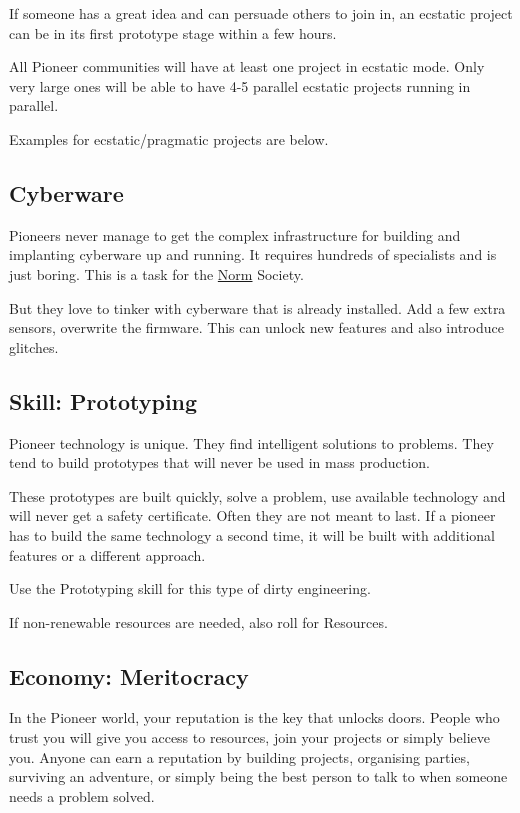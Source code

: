 If someone has a great idea and can persuade others to join in, an ecstatic project can be in its first prototype stage within a few hours.

All Pioneer communities will have at least one project in ecstatic mode. Only very large ones will be able to have 4-5 parallel ecstatic projects running in parallel.

Examples for ecstatic/pragmatic projects are below.

\subsection{Cyberware}
\label{sec:Cyberware Pioneers}

Pioneers never manage to get the complex infrastructure for building and implanting cyberware up and running. It requires hundreds of specialists and is just boring. This is a task for the \hyperref[sec:Cyberware Norm]{Norm} Society.

But they love to tinker with cyberware that is already installed. Add a few extra sensors, overwrite the firmware. This can unlock new features and also introduce glitches.


\subsection{Skill: Prototyping}
\label{sec:Prototyping skill}

Pioneer technology is unique. They find intelligent solutions to problems. They tend to build prototypes that will never be used in mass production.

These prototypes are built quickly, solve a problem, use available technology and will never get a safety certificate.
Often they are not meant to last.
If a pioneer has to build the same technology a second time, it will be built with additional features or a different approach.

Use the Prototyping skill for this type of dirty engineering.

If non-renewable resources are needed, also roll for Resources.

\subsection{Economy: Meritocracy}
\label{sec:meritocracy}

In the Pioneer world, your reputation is the key that unlocks doors. People who trust you will give you access to resources, join your projects or simply believe you.
Anyone can earn a reputation by building projects, organising parties, surviving an adventure, or simply being the best person to talk to when someone needs a problem solved.

